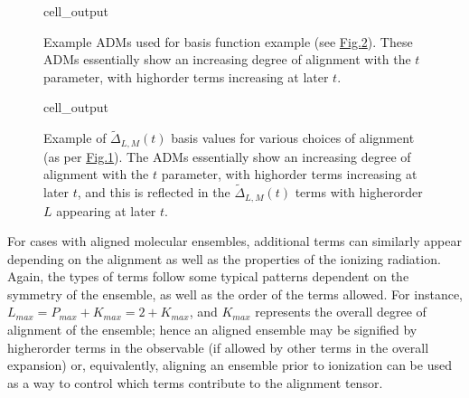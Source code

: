 \documentclass[letterpaper,table,10pt,english]{jupyterBook}
\begin{document}
\begin{figure}[htbp]
\centering
\capstart
\begin{sphinxVerbatimOutput}

\begin{sphinxuseclass}{cell_output}
\noindent{}

\end{sphinxuseclass}\end{sphinxVerbatimOutput}
\caption{Example ADMs used for {\hyperref[\detokenize{backmatter/glossary:term-AF}]{}} basis function example (see \hyperref[\detokenize{part1/theory_tensor_formalism_201122:fig-afterm-linearramp}]{Fig.\@ \ref{\detokenize{part1/theory_tensor_formalism_201122:fig-afterm-linearramp}}}). These ADMs essentially show an increasing degree of alignment with the \(t\) parameter, with high\sphinxhyphen{}order terms increasing at later \(t\).}\label{\detokenize{part1/theory_tensor_formalism_201122:fig-adms-linearramp}}\end{figure}

\begin{figure}[htbp]
\centering
\capstart
\begin{sphinxVerbatimOutput}

\begin{sphinxuseclass}{cell_output}
\noindent{}

\end{sphinxuseclass}\end{sphinxVerbatimOutput}
\caption{Example of \(\tilde{\Delta}_{L,M}(t)\) basis values for various choices of alignment (as per \hyperref[\detokenize{part1/theory_tensor_formalism_201122:fig-adms-linearramp}]{Fig.\@ \ref{\detokenize{part1/theory_tensor_formalism_201122:fig-adms-linearramp}}}). The ADMs essentially show an increasing degree of alignment with the \(t\) parameter, with high\sphinxhyphen{}order terms increasing at later \(t\), and this is reflected in the \(\tilde{\Delta}_{L,M}(t)\) terms with higher\sphinxhyphen{}order \(L\) appearing at later \(t\).}\label{\detokenize{part1/theory_tensor_formalism_201122:fig-afterm-linearramp}}\end{figure}

\sphinxAtStartPar
For cases with aligned molecular ensembles, additional terms can similarly appear depending on the alignment as well as the properties of the ionizing radiation. Again, the types of terms follow some typical patterns dependent on the symmetry of the ensemble, as well as the order of the terms allowed. For instance, \(L_{max}=P_{max}+K_{max}=2+K_{max}\), and \(K_{max}\) represents the overall degree of alignment of the ensemble; hence an aligned ensemble may be signified by higher\sphinxhyphen{}order terms in the observable (if allowed by other terms in the overall expansion) or, equivalently, aligning an ensemble prior to ionization can be used as a way to control which terms contribute to the alignment tensor.
\end{document}
